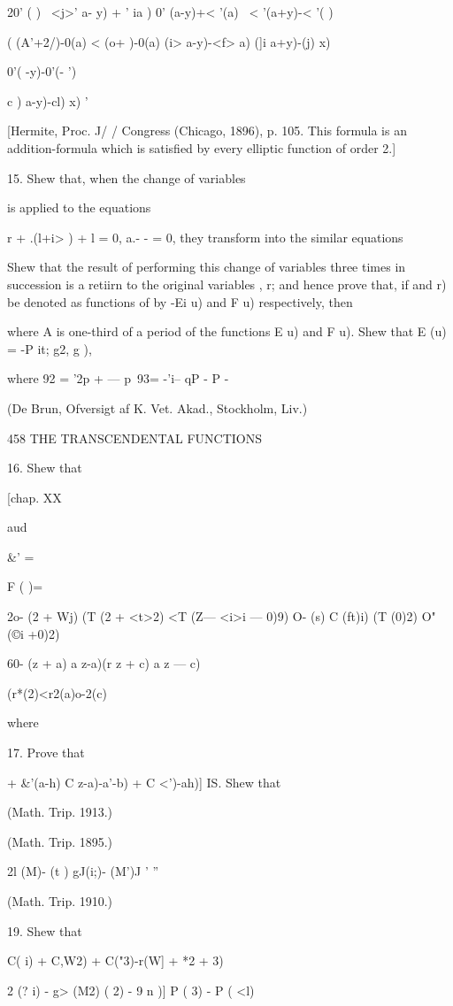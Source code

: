 {20' ( ) \ <j>' a- y) + ' ia ) 0' (a-y)+< '(a) \ < '(a+y)-< '( )

( (A'+2/)-0(a) < (o+ )-0(a) (i> a-y)-<f> a) (]i a+y)-(j) x)

0'( -y)-0'(- ')

c ) a-y)-cl) x) '

[Hermite, Proc. J/ / Congress (Chicago, 1896), p. 105. This formula is
an addition-formula which is satisfied by every elliptic function of
order 2.]

15. Shew that, when the change of variables

is applied to the equations

r + .(l+i> ) + l = 0, a.- - = 0, they transform into the similar
equations

Shew that the result of performing this change of variables three
times in succession is a retiirn to the original variables , r; and
hence prove that, if and r) be denoted as functions of by -Ei u) and F
u) respectively, then

where A is one-third of a period of the functions E u) and F u). Shew
that E (u) = -P it; g2, g ),

where 92 = '2p + — p\ 93= -'i-- qP - P -

(De Brun, Ofversigt af K. Vet. Akad., Stockholm, Liv.)

458 THE TRANSCENDENTAL FUNCTIONS

16. Shew that

[chap. XX

aud

\&' =

F ( )=

2o- (2 + Wj) (T (2 + <t>2) <T (Z— <i>i — 0)9) O- (s) C (ft)i) (T (0)2)
O" (©i +0)2)

60- (z + a) a z-a)(r z + c) a z — c)

(r*(2)<r2(a)o-2(c)

where

17. Prove that

+ \&'(a-h) C z-a)-a'-b) + C <')-ah)] IS. Shew that

(Math. Trip. 1913.)

(Math. Trip. 1895.)

2l (M)- (t ) gJ(i;)- (M')J ' ''

(Math. Trip. 1910.)

19. Shew that

C( i) + C,W2) + C("3)-r(W] + *2 + 3)

2 (? i) - g> (M2) ( 2) - 9 n )] P ( 3) - P ( <l)

}
